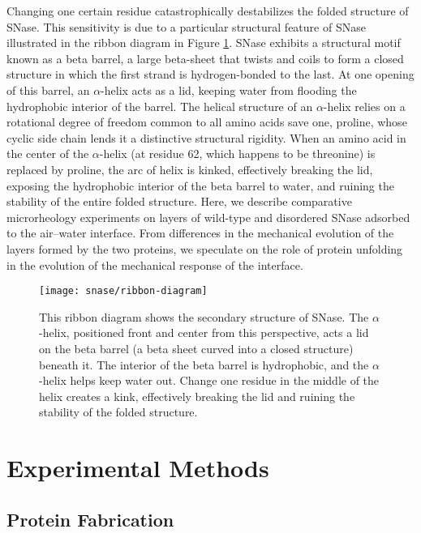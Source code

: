 Changing one certain residue catastrophically destabilizes the folded structure of SNase. This sensitivity is due to a particular structural feature of SNase illustrated in the ribbon diagram in Figure \ref{fig:ribbon-diagram}. SNase exhibits a structural motif known as a beta barrel, a large beta-sheet that twists and coils to form a closed structure in which the first strand is hydrogen-bonded to the last. At one opening of this barrel, an $\alpha$-helix acts as a lid, keeping water from flooding the hydrophobic interior of the barrel. The helical structure of an $\alpha$-helix relies on a rotational degree of freedom common to all amino acids save one, proline, whose cyclic side chain lends it a distinctive structural rigidity. When an amino acid in the center of the $\alpha$-helix (at residue 62, which happens to be threonine) is replaced by proline, the arc of helix is kinked, effectively breaking the lid, exposing the hydrophobic interior of the beta barrel to water, and ruining the stability of the entire folded structure. Here, we describe comparative microrheology experiments on layers of wild-type and disordered SNase adsorbed to the air--water interface. From differences in the mechanical evolution of the layers formed by the two proteins, we speculate on the role of protein unfolding in the evolution of the mechanical response of the interface.

\begin{figure}
 \texttt{[image: snase/ribbon-diagram]}
 \caption[Ribbon diagram of Wild-Type SNase]{\label{fig:ribbon-diagram}This ribbon diagram shows the secondary structure of SNase. The $\alpha$-helix, positioned front and center from this perspective, acts a lid on the beta barrel (a beta sheet curved into a closed structure) beneath it. The interior of the beta barrel is hydrophobic, and the $\alpha$-helix helps keep water out. Change one residue in the middle of the helix creates a kink, effectively breaking the lid and ruining the stability of the folded structure.}
\end{figure}

\section{Experimental Methods}

\subsection{Protein Fabrication}

